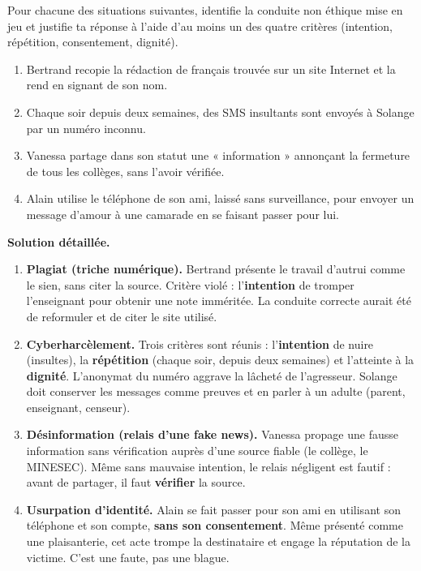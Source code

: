 \documentclass[11pt]{article}
\begin{document}
\begin{exoresolu}
Pour chacune des situations suivantes, identifie la conduite non éthique mise en jeu et justifie ta réponse à l'aide d'au moins un des quatre critères (intention, répétition, consentement, dignité).
\begin{enumerate}
\item Bertrand recopie la rédaction de français trouvée sur un site Internet et la rend en signant de son nom.
\item Chaque soir depuis deux semaines, des SMS insultants sont envoyés à Solange par un numéro inconnu.
\item Vanessa partage dans son statut une « information » annonçant la fermeture de tous les collèges, sans l'avoir vérifiée.
\item Alain utilise le téléphone de son ami, laissé sans surveillance, pour envoyer un message d'amour à une camarade en se faisant passer pour lui.
\end{enumerate}
\tcblower
\textbf{Solution détaillée.}
\begin{enumerate}
\item \textbf{Plagiat (triche numérique).} Bertrand présente le travail d'autrui comme le sien, sans citer la source. Critère violé : l'\textbf{intention} de tromper l'enseignant pour obtenir une note imméritée. La conduite correcte aurait été de reformuler et de citer le site utilisé.
\item \textbf{Cyberharcèlement.} Trois critères sont réunis : l'\textbf{intention} de nuire (insultes), la \textbf{répétition} (chaque soir, depuis deux semaines) et l'atteinte à la \textbf{dignité}. L'anonymat du numéro aggrave la lâcheté de l'agresseur. Solange doit conserver les messages comme preuves et en parler à un adulte (parent, enseignant, censeur).
\item \textbf{Désinformation (relais d'une fake news).} Vanessa propage une fausse information sans vérification auprès d'une source fiable (le collège, le MINESEC). Même sans mauvaise intention, le relais négligent est fautif : avant de partager, il faut \textbf{vérifier} la source.
\item \textbf{Usurpation d'identité.} Alain se fait passer pour son ami en utilisant son téléphone et son compte, \textbf{sans son consentement}. Même présenté comme une plaisanterie, cet acte trompe la destinataire et engage la réputation de la victime. C'est une faute, pas une blague.
\end{enumerate}
\end{exoresolu}
\end{document}
